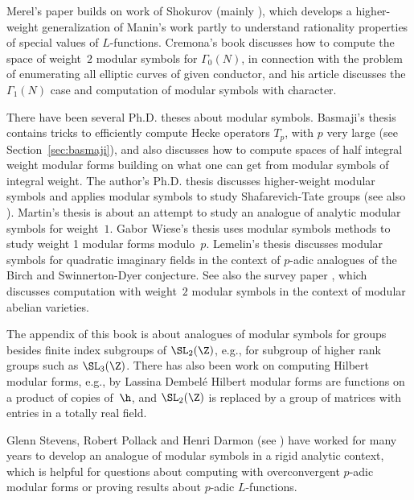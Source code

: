 Merel's paper \cite{merel:1585} builds on work of Shokurov (mainly
\cite{sokurov:shimura}), which develops a higher-weight
generalization of Manin's work partly to understand rationality
properties of special values of $L$-functions. Cremona's book
\cite{cremona:algs} discusses how to compute the space of
weight~$2$ modular symbols for $\Gamma_0(N)$, in connection with the
problem of enumerating all elliptic curves of given conductor, and his
article \cite{cremona:gammaone} discusses the $\Gamma_1(N)$ case and
computation of modular symbols with character.

There have been several Ph.D. theses about modular symbols.
Basmaji's thesis \cite{basmaji:thesis} contains tricks to efficiently
compute Hecke operators $T_p$, with $p$ very large (see
Section~\ref{sec:basmaji}), and also discusses how to compute spaces
of half integral weight modular forms building on what one can get
from modular symbols of integral weight. The author's Ph.D. thesis
\cite{stein:phd} discusses higher-weight modular
symbols and applies modular symbols to study Shafarevich-Tate groups
(see also \cite{agashe:phd}).  Martin's thesis \cite{martin:thesis} is
about an attempt to study an analogue of analytic modular symbols for
weight~$1$.  Gabor Wiese's thesis \cite{gabor:phd} uses modular
symbols methods to study weight 1 modular forms modulo~$p$.  Lemelin's
thesis \cite{lemelin:dominic} discusses modular symbols for quadratic
imaginary fields in the context of $p$-adic analogues of the Birch and
Swinnerton-Dyer conjecture.  See also the survey paper
\cite{frey-muller}, which discusses computation with weight~$2$
modular symbols in the context of modular abelian
varieties.

The appendix of this book is about
analogues of modular symbols for groups besides
finite index subgroups of $\SL_2(\Z)$, e.g., for subgroup
of higher rank groups such as $\SL_3(\Z)$.  
There has also been work on computing Hilbert
modular forms, e.g., by Lassina Dembel\'e \cite{dembele:hilbert5} Hilbert modular forms are functions on a product of copies of~$\h$, and
$\SL_2(\Z)$ is replaced by a group of matrices with entries in a
totally real field.  

Glenn Stevens, Robert Pollack and Henri Darmon (see
\cite{darmon-pollack}) have worked for many years to develop an
analogue of modular symbols in a rigid analytic context, which is 
helpful for questions about computing with overconvergent
$p$-adic modular forms or proving results about $p$-adic
$L$-functions.

